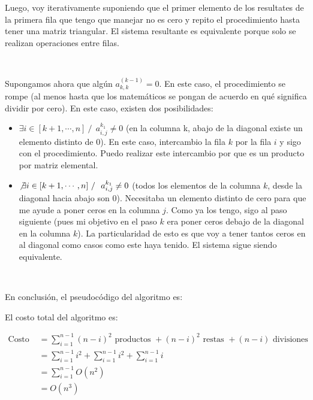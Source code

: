 \documentclass[]{article}
\begin{document}
Luego, voy iterativamente suponiendo que el primer elemento de los resultates de la primera fila que tengo que manejar no es cero y repito el procedimiento hasta tener una matriz triangular. El sistema resultante es equivalente porque solo se realizan operaciones entre filas.

~\newline

Supongamos ahora que algún $a^{(k-1)}_{k,k} = 0$. En este caso, el procedimiento se rompe (al menos hasta que los matemáticos se pongan de acuerdo en qué significa dividir por cero). En este caso, existen dos posibilidades:
\begin{itemize}
	\item $\exists i \in [k+1,\cdots,n]\ /\ \ a^{k_1}_{i,j}\neq0$ (en la columna k, abajo de la diagonal existe un elemento distinto de 0). En este caso, intercambio la fila $k$ por la fila $i$ y sigo con el procedimiento. Puedo realizar este intercambio por que es un producto por matriz elemental.

	\item $\not\exists i \in [k+1,\cdots,n]\ /\ \ a^{k_1}_{i,j}\neq0$ (todos los elementos de la columna $k$, desde la diagonal hacia abajo son 0). Necesitaba un elemento distinto de cero para que me ayude a poner ceros en la columna $j$. Como ya los tengo, sigo al paso siguiente (pues mi objetivo en el paso $k$ era poner ceros debajo de la diagonal en la columna $k$). La particularidad de esto es que voy a tener tantos ceros en al diagonal como casos como este haya tenido. El sistema sigue siendo equivalente.
\end{itemize}


~\newline

En conclusión, el pseudocódigo del algoritmo es:


El costo total del algoritmo es:
\begin{center}

\begin{align*}
	\displaystyle\text{Costo }&=  \sum_{i=1}^{n-1}(n-i)^2\text{ productos } + (n-i)^2\text{ restas } + (n-i)\text{ divisiones }\\
	&= \displaystyle\sum_{i=1}^{n-1}i^2 + \sum_{i=1}^{n-1}i^2 + \sum_{i=1}^{n-1}i\\
	&= \displaystyle\sum_{i=1}^{n-1}O(n^2)\\
	&= O(n^3)
\end{align*}
\end{center}
\end{document}
